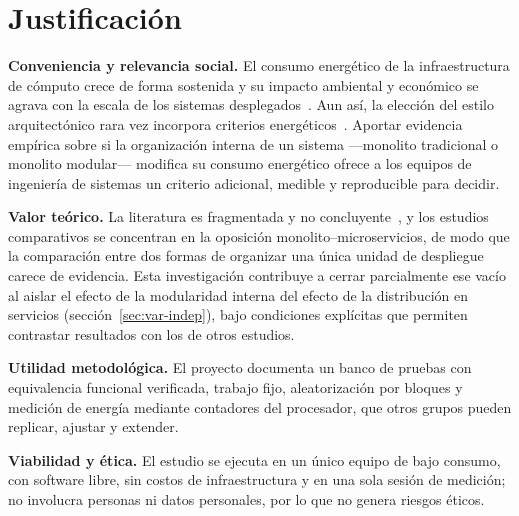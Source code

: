 \chapter{Justificación}
\label{cap:justificacion}

\textbf{Conveniencia y relevancia social.} El consumo energético de la infraestructura de cómputo crece de forma sostenida y su impacto ambiental y económico se agrava con la escala de los sistemas desplegados~\cite{marimuthu2017green,verdecchia2021green}. Aun así, la elección del estilo arquitectónico rara vez incorpora criterios energéticos~\cite{khan2020cloud}. Aportar evidencia empírica sobre si la organización interna de un sistema ---monolito tradicional o monolito modular--- modifica su consumo energético ofrece a los equipos de ingeniería de sistemas un criterio adicional, medible y reproducible para decidir.

\textbf{Valor teórico.} La literatura es fragmentada y no concluyente~\cite{araujo2024energy,capuano2026comparative}, y los estudios comparativos se concentran en la oposición monolito--microservicios, de modo que la comparación entre dos formas de organizar una única unidad de despliegue carece de evidencia. Esta investigación contribuye a cerrar parcialmente ese vacío al aislar el efecto de la modularidad interna del efecto de la distribución en servicios (sección~\ref{sec:var-indep}), bajo condiciones explícitas que permiten contrastar resultados con los de otros estudios.

\textbf{Utilidad metodológica.} El proyecto documenta un banco de pruebas con equivalencia funcional verificada, trabajo fijo, aleatorización por bloques y medición de energía mediante contadores del procesador, que otros grupos pueden replicar, ajustar y extender.

\textbf{Viabilidad y ética.} El estudio se ejecuta en un único equipo de bajo consumo, con software libre, sin costos de infraestructura y en una sola sesión de medición; no involucra personas ni datos personales, por lo que no genera riesgos éticos.

